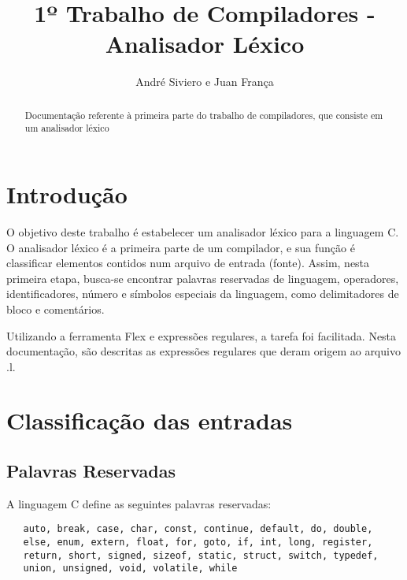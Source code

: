 \documentclass[a4paper,10pt]{article}
\title{1º Trabalho de Compiladores - Analisador Léxico}
\author{André Siviero e Juan França}
\begin{document}
\maketitle

\begin{abstract}
Documentação referente à primeira parte do trabalho de compiladores, que consiste em um analisador léxico
\end{abstract}

\section{Introdução}
O objetivo deste trabalho é estabelecer um analisador léxico para a linguagem C. O analisador léxico é a primeira parte de um compilador,
e sua função é classificar elementos contidos num arquivo de entrada (fonte). Assim, nesta primeira etapa, busca-se encontrar palavras
reservadas de linguagem, operadores, identificadores, número e símbolos especiais da linguagem, como delimitadores de bloco e comentários.

Utilizando a ferramenta Flex e expressões regulares, a tarefa foi facilitada. Nesta documentação, são descritas as expressões regulares que
deram origem ao arquivo .l.
\section{Classificação das entradas}
  \subsection{Palavras Reservadas}
  A linguagem C define as seguintes palavras reservadas:
  \begin{verbatim}
   auto, break, case, char, const, continue, default, do, double, 
   else, enum, extern, float, for, goto, if, int, long, register, 
   return, short, signed, sizeof, static, struct, switch, typedef, 
   union, unsigned, void, volatile, while
  \end{verbatim} 
  
\end{document}
